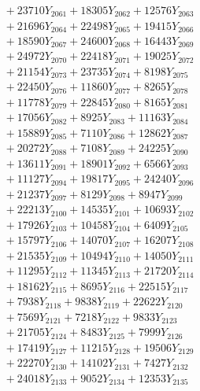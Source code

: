 \documentclass[a4paper,10pt]{article}
\begin{document}
{\begin{align}
&\;  + 23710 Y_{2061} + 18305 Y_{2062} + 12576 Y_{2063} \\[0.3ex]
&\;  + 21696 Y_{2064} + 22498 Y_{2065} + 19415 Y_{2066} \\[0.3ex]
&\;  + 18590 Y_{2067} + 24600 Y_{2068} + 16443 Y_{2069} \\[0.5ex]\allowbreak
&\;  + 24972 Y_{2070} + 22418 Y_{2071} + 19025 Y_{2072} \\[0.3ex]
&\;  + 21154 Y_{2073} + 23735 Y_{2074} + 8198 Y_{2075} \\[0.3ex]
&\;  + 22450 Y_{2076} + 11860 Y_{2077} + 8265 Y_{2078} \\[0.3ex]
&\;  + 11778 Y_{2079} + 22845 Y_{2080} + 8165 Y_{2081} \\[0.3ex]
&\;  + 17056 Y_{2082} + 8925 Y_{2083} + 11163 Y_{2084} \\[0.3ex]
&\;  + 15889 Y_{2085} + 7110 Y_{2086} + 12862 Y_{2087} \\[0.3ex]
&\;  + 20272 Y_{2088} + 7108 Y_{2089} + 24225 Y_{2090} \\[0.3ex]
&\;  + 13611 Y_{2091} + 18901 Y_{2092} + 6566 Y_{2093} \\[0.3ex]
&\;  + 11127 Y_{2094} + 19817 Y_{2095} + 24240 Y_{2096} \\[0.3ex]
&\;  + 21237 Y_{2097} + 8129 Y_{2098} + 8947 Y_{2099} \\[0.5ex]\allowbreak
&\;  + 22213 Y_{2100} + 14535 Y_{2101} + 10693 Y_{2102} \\[0.3ex]
&\;  + 17926 Y_{2103} + 10458 Y_{2104} + 6409 Y_{2105} \\[0.3ex]
&\;  + 15797 Y_{2106} + 14070 Y_{2107} + 16207 Y_{2108} \\[0.3ex]
&\;  + 21535 Y_{2109} + 10494 Y_{2110} + 14050 Y_{2111} \\[0.3ex]
&\;  + 11295 Y_{2112} + 11345 Y_{2113} + 21720 Y_{2114} \\[0.3ex]
&\;  + 18162 Y_{2115} + 8695 Y_{2116} + 22515 Y_{2117} \\[0.3ex]
&\;  + 7938 Y_{2118} + 9838 Y_{2119} + 22622 Y_{2120} \\[0.3ex]
&\;  + 7569 Y_{2121} + 7218 Y_{2122} + 9833 Y_{2123} \\[0.3ex]
&\;  + 21705 Y_{2124} + 8483 Y_{2125} + 7999 Y_{2126} \\[0.3ex]
&\;  + 17419 Y_{2127} + 11215 Y_{2128} + 19506 Y_{2129} \\[0.5ex]\allowbreak
&\;  + 22270 Y_{2130} + 14102 Y_{2131} + 7427 Y_{2132} \\[0.3ex]
&\;  + 24018 Y_{2133} + 9052 Y_{2134} + 12353 Y_{2135} \\[0.3ex]

\end{align}}
\end{document}
